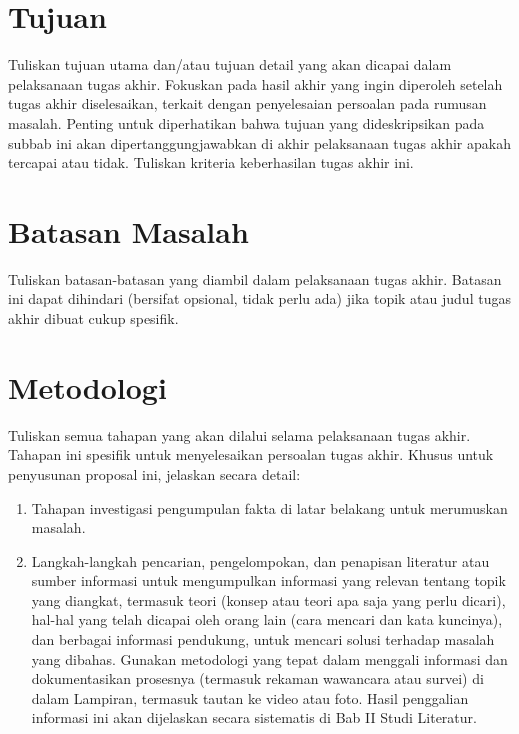 \section{Tujuan}
Tuliskan tujuan utama dan/atau tujuan detail yang akan dicapai dalam pelaksanaan tugas akhir. Fokuskan pada hasil akhir yang ingin diperoleh setelah tugas akhir diselesaikan, terkait dengan penyelesaian persoalan pada rumusan masalah. Penting untuk diperhatikan bahwa tujuan yang dideskripsikan pada subbab ini akan dipertanggungjawabkan di akhir pelaksanaan tugas akhir apakah tercapai atau tidak. Tuliskan kriteria keberhasilan tugas akhir ini.

\section{Batasan Masalah}
Tuliskan batasan-batasan yang diambil dalam pelaksanaan tugas akhir. Batasan ini dapat dihindari (bersifat opsional, tidak perlu ada) jika topik atau judul tugas akhir dibuat cukup spesifik.

\section{Metodologi}
Tuliskan semua tahapan yang akan dilalui selama pelaksanaan tugas akhir. Tahapan ini spesifik untuk menyelesaikan persoalan tugas akhir. Khusus untuk penyusunan proposal ini, jelaskan secara detail:
\begin{enumerate}
\item	Tahapan investigasi pengumpulan fakta di latar belakang untuk merumuskan masalah.
\item	Langkah-langkah pencarian, pengelompokan, dan penapisan literatur atau sumber informasi untuk mengumpulkan informasi yang relevan tentang topik yang diangkat, termasuk teori (konsep atau teori apa saja yang perlu dicari), hal-hal yang telah dicapai oleh orang lain (cara mencari dan kata kuncinya), dan berbagai informasi pendukung, untuk mencari solusi terhadap masalah yang dibahas. Gunakan metodologi yang tepat dalam menggali informasi dan dokumentasikan prosesnya (termasuk rekaman wawancara atau survei) di dalam Lampiran, termasuk tautan ke video atau foto. Hasil penggalian informasi ini akan dijelaskan secara sistematis di Bab II Studi Literatur.
\end{enumerate}